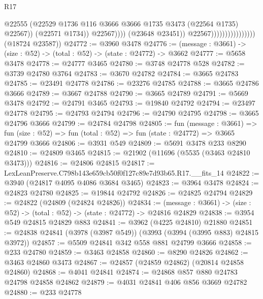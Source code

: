 \begin{lexlean}{R17}
\begin{coremodule}
                                                    @22555
                                                    (@22529
                                                      @1736
                                                      @116
                                                      @3666
                                                      @3666
                                                      @1735
                                                      @3473
                                                      (@22564 @1735)
                                                      @22567))
                                                  (@22571 @1734))
                                                @22567))))
                                        (@23648 @23451))
                                      @22567))))))))))))))))
      (@18724 @23587))
@24772 := @3960 @3478
@24776 := (message : @3661) -> (size : @52) -> (total : @52) -> (state : @24772) -> @3662
@24777 := @5658 @3478
@24778 := @24777 @3465
@24780 := @3748 @24778 @528
@24782 := @3739 @24780 @3764
@24783 := @3670 @24782
@24784 := @3665 @24783
@24785 := @23491 @24778
@24786 := @23276 @24785
@24788 := @3665 @24786 @3666
@24789 := @3667 @24788
@24790 := @3665 @24789
@24791 := @5669 @3478
@24792 := @24791 @3465
@24793 := @19840 @24792
@24794 := @23497 @24778
@24795 := @24793 @24794
@24796 := @24790 @24795
@24798 := @3665 @24796 @3666
@24799 := @24784 @24798
@24805 := fun (message : @3661) =>
  fun (size : @52) => fun (total : @52) => fun (state : @24772) => @3665 @24799 @3666
@24806 := @3931 @549
@24809 := @5691 @3478 @233 @8290
@24810 := @24809 @3465
@24815 := @21902 (@11696 (@5535 (@3463 @24810 @3473)))
@24816 := @24806 @24815
@24817 := LexLeanPreserve.C798b143e659cb50f0f127c89e7d93b65.R17.__fits_14
@24822 := @3940 (@24817 @4095 @4086 @3684 @3465)
@24823 := @3964 @3478
@24824 := @24823 @24780
@24825 := @19844 @24792
@24826 := @24825 @24794
@24829 := @24822 (@24809 (@24824 @24826))
@24834 := (message : @3661) -> (size : @52) -> (total : @52) -> (state : @24772) -> @24816 @24829
@24838 := @3954 @549 @24815 @24829 @883
@24841 := @3962 (@4225 @24810) @21880
@24851 := @24838 @24841 (@3978 (@3987 @549)) (@3993 (@3994 (@3995 @883) @24815 @3972))
@24857 := @5509 @24841 @342 @558 @881 @24799 @3666
@24858 := @233 @24780
@24859 := @3463 @24858
@24860 := @8290 @24826
@24862 := @3463 @24860 @3473
@24867 := @24857 (@24859 @24862) (@20814 @24858 @24860)
@24868 := @4041 @24841
@24874 := @24868 @857 @880 @24783 @24798 @24858 @24862
@24879 := @4031 @24841 @406 @856 @3669 @24782
@24880 := @233 @24778

\end{coremodule}
\end{lexlean}
